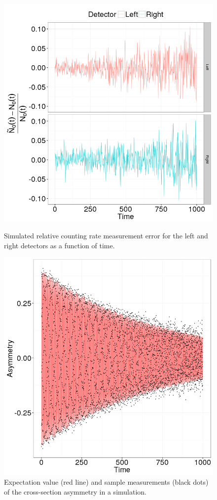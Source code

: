 \documentclass{jacow}
\begin{document}
\begin{figure}[h]
	\begin{minipage}{.45\textwidth}
		\centering
		\includegraphics[scale=.4]{img/Final/LR_detector_relErr}
		\caption{Simulated relative counting rate measurement error for the left and right detectors as a function of time.\label{fig:LRDetErr}}
	\end{minipage}\hspace{.5in}
	\begin{minipage}{.45\textwidth}
		\centering
		\includegraphics[scale=.4]{img/Final/Asymmetry}
		\caption{Expectation value (red line) and sample measurements (black dots) of the cross-section asymmetry in a simulation.\label{fig:Asym}}
	\end{minipage}
	

\end{figure}
\end{document}
